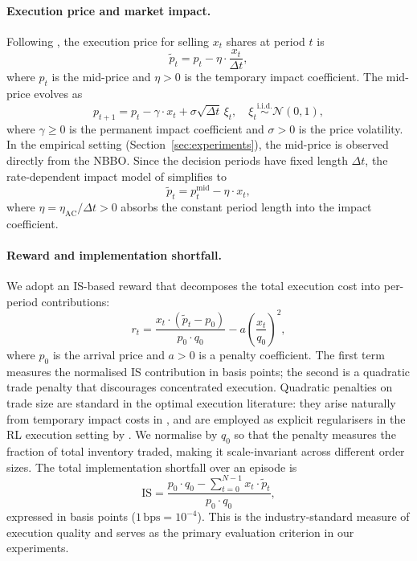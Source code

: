 \documentclass[11pt]{article}
\begin{document}
\paragraph{Execution price and market impact.}
Following \citet{almgren2001optimal} , the execution price for selling $x_t$ shares at period $t$ is
\begin{equation}\label{eq:exec_price}
    \tilde{p}_t = p_t - \eta \cdot \frac{x_t}{\Delta t},
\end{equation}
where $p_t$ is the mid-price and $\eta > 0$ is the temporary impact coefficient. The mid-price evolves as
\begin{equation}\label{eq:price_dynamics}
    p_{t+1} = p_t - \gamma \cdot x_t + \sigma \sqrt{\Delta t}\, \xi_t, \quad \xi_t \overset{\mathrm{i.i.d.}}{\sim} \mathcal{N}(0,1),
\end{equation}
where $\gamma \geq 0$ is the permanent impact coefficient and $\sigma > 0$ is the price volatility. In the empirical setting (Section~\ref{sec:experiments}), the mid-price 
is observed directly from the NBBO. Since the decision periods have 
fixed length $\Delta t$, the rate-dependent impact model of 
\citet{almgren2001optimal} simplifies to
\begin{equation}
\label{eq:taq_exec_price}
    \tilde{p}_t = p_t^{\mathrm{mid}} - \eta \cdot x_t,
\end{equation}
where $\eta = \eta_{\mathrm{AC}} / \Delta t > 0$ absorbs the constant 
period length into the impact coefficient.

\paragraph{Reward and implementation shortfall.}
We adopt an IS-based reward that decomposes the total execution cost into per-period contributions:
\begin{equation}\label{eq:reward}
    r_t = \frac{x_t \cdot (\tilde{p}_t - p_0)}{p_0 \cdot q_0} - a \left(\frac{x_t}{q_0}\right)^{\!2},
\end{equation}
where $p_0$ is the arrival price and $a > 0$ is a penalty coefficient. The first term measures the normalised IS contribution in basis points; the second is a quadratic trade penalty that discourages 
concentrated execution. Quadratic penalties on trade size are 
standard in the optimal execution literature: they arise naturally 
from temporary impact costs in  
\citet{almgren2001optimal}, and are employed as explicit 
regularisers in the RL execution setting by \citet{ning2021double}. 
We normalise by $q_0$ so that the penalty measures the fraction 
of total inventory traded, making it scale-invariant across 
different order sizes. The total implementation shortfall over an episode is
\begin{equation}\label{eq:is}
    \mathrm{IS} = \frac{p_0 \cdot q_0 - \sum_{t=0}^{N-1} x_t \cdot \tilde{p}_t}{p_0 \cdot q_0},
\end{equation}
expressed in basis points ($1\,\mathrm{bps} = 10^{-4}$). This is the industry-standard measure of execution quality \citet{perold1988implementation} and serves as the primary evaluation criterion in our experiments.
\end{document}
